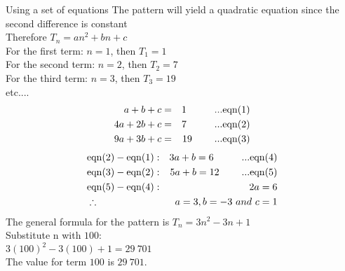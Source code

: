 \begin{wex}{Using a set of equations}
{The pattern will yield a quadratic equation since the second difference is
constant\\
Therefore $T_n = an^2 + bn + c$\\
For the first term: $n = 1$,  then $T_1 = 1$ \\
For the second term: $n = 2$, then $T_2 = 7$ \\  
For the third term:  $n = 3$,  then $T_3 = 19$ \\
etc....\\
\begin{eqnarray*}
a+b+c &=& 1 \hspace{1cm} \rm {...eqn} (1)\\
4a + 2b + c &=& 7 \hspace{1cm} \rm {...eqn} (2)\\
9a + 3b + c &=& 19 \hspace{0.8cm} \rm {...eqn} (3)
\end{eqnarray*}
\begin{eqnarray*}
&\rm{eqn} (2) - \rm{eqn} (1):& 3a + b = 6 \hspace{1cm} \rm {...eqn} (4)\\
&\rm{eqn} (3) - \rm{eqn} (2):& 5a + b = 12 \hspace{0.8cm} \rm {...eqn} (5)\\
&\rm{eqn} (5) - \rm{eqn} (4):& 2a = 6\\
&\therefore & a = 3, b = -3 ~and~ c = 1
\end{eqnarray*}
The general formula for the pattern is $T_n = 3n^2 - 3n + 1$\\
Substitute n with $100$:\\
$3(100)^2 - 3(100) + 1 = 29~701$\\
The value for term $100$ is $29~701$.
}
\end{wex}


